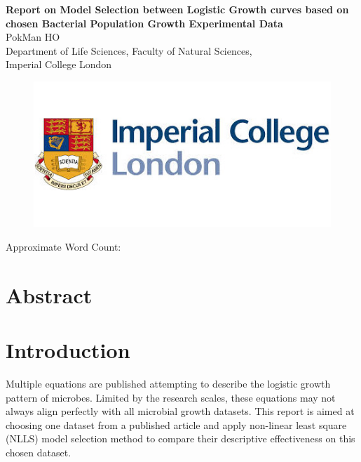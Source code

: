 \documentclass[a4paper, 11pt]{article}
\title{\ReportTitle}
\author{\ReportAuthor (CID: 01786076)}
\date{}
\newcommand{\ReportTitle}{Report on Model Selection between Logistic Growth curves based on chosen Bacterial Population Growth Experimental Data} %
\newcommand{\ReportAuthor}{PokMan HO}
\newcommand{\ReportAffil}{Department of Life Sciences, Faculty of Natural Sciences,\\Imperial College London}
\begin{document}
	\begin{center}
		\Huge\textbf{\ReportTitle}\\
		\LARGE\ReportAuthor\\
		\Large\ReportAffil
	\end{center}
	\begin{figure}[h]
		\centering\includegraphics[width=\linewidth]{icl.jpg}
	\end{figure}
	\begin{flushright}
		\Large Approximate Word Count: %
	\end{flushright}
	\clearpage
	
	\maketitle
	\section*{Abstract}
	
	
	\section*{Introduction}
	Multiple equations are published attempting to describe the logistic growth pattern of microbes.  Limited by the research scales, these equations may not always align perfectly with all microbial growth datasets.  This report is aimed at choosing one dataset from a published article and apply non-linear least square (NLLS) model selection method to compare their descriptive effectiveness on this chosen dataset.
	
\end{document}
